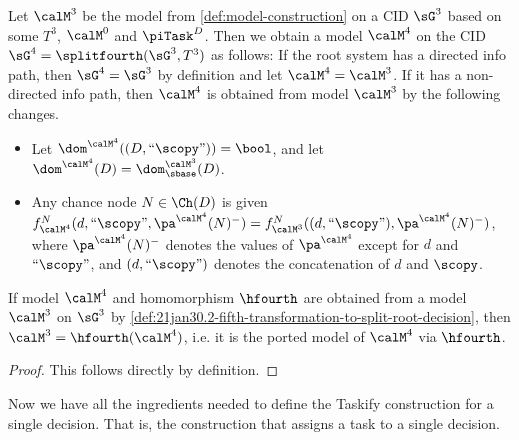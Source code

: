 \begin{definition}  \label{def:21feb7.3-model-adjustment-after-fifth=transformation}
Let $\calM^3$ be the model from \autoref{def:model-construction} on a CID $\sG^3$ based on some $T^3$, $\calM^0$ and $\piTask^{D}$. Then we obtain a model $\calM^4$ on the CID $\sG^4=\splitfourth(\sG^3, T^3)$ as follows: If the root system has a directed info path, then $\sG^4 =\sG^3$ by definition and let $\calM^4=\calM^3$. If it has a non-directed info path, then $\calM^4$ is obtained from model $\calM^3$ by the following changes. 
\begin{itemize}
    \item Let $\dom^{\calM^4}((D,``\scopy"))=\bool$, and let $\dom^{\calM^4}(D)=\dom^{\calM^3}_\sbase(D)$.  

    \item Any chance node $N \in \Ch(D)$ is given $f^N_{\calM^4}(d,``\scopy",\pa^{\calM^4}(N)^-)=f^N_{\calM^3}((d,``\scopy"),\pa^{\calM^4}(N)^-)$, where $\pa^{\calM^4}(N)^-$ denotes the values of $\pa^{\calM^4}$ except for $d$ and $``\scopy"$, and $(d,``\scopy")$ denotes the concatenation of $d$ and $\scopy$.
\end{itemize}
\end{definition}




\begin{lemma}  \label{le:21feb7.1-Transformation-4-produces-an-equivalent-model}
If model $\calM^4$ and homomorphism $\hfourth$ are obtained from a model $\calM^3$ on $\sG^3$ by \autoref{def:21jan30.2-fifth-transformation-to-split-root-decision}, then $\calM^3=\hfourth(\calM^4)$, i.e. it is the ported model of $\calM^4$ via $\hfourth$.
\end{lemma}


\begin{proof}
This follows directly by definition.
\end{proof}


Now we have all the ingredients needed to define the Taskify construction for a single decision. That is, the construction that assigns a task to a single decision.










